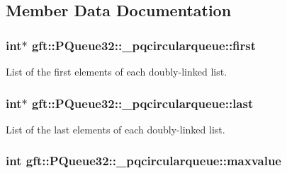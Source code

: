 \subsection{Member Data Documentation}
\subsubsection[{\texorpdfstring{first}{first}}]{\setlength{\rightskip}{0pt plus 5cm}int$\ast$ gft\+::\+P\+Queue32\+::\+\_\+pqcircularqueue\+::first}\hypertarget{structgft_1_1PQueue32_1_1__pqcircularqueue_abdbbf105caf80766f51fbc271d794ccb}{}\label{structgft_1_1PQueue32_1_1__pqcircularqueue_abdbbf105caf80766f51fbc271d794ccb}


List of the first elements of each doubly-\/linked list. 

\subsubsection[{\texorpdfstring{last}{last}}]{\setlength{\rightskip}{0pt plus 5cm}int$\ast$ gft\+::\+P\+Queue32\+::\+\_\+pqcircularqueue\+::last}\hypertarget{structgft_1_1PQueue32_1_1__pqcircularqueue_a9d495d213b910328120e4ed127dcbaec}{}\label{structgft_1_1PQueue32_1_1__pqcircularqueue_a9d495d213b910328120e4ed127dcbaec}


List of the last elements of each doubly-\/linked list. 

\subsubsection[{\texorpdfstring{maxvalue}{maxvalue}}]{\setlength{\rightskip}{0pt plus 5cm}int gft\+::\+P\+Queue32\+::\+\_\+pqcircularqueue\+::maxvalue}\hypertarget{structgft_1_1PQueue32_1_1__pqcircularqueue_a48f348ed1f639dd4970aa5f35feb81e0}{}\label{structgft_1_1PQueue32_1_1__pqcircularqueue_a48f348ed1f639dd4970aa5f35feb81e0}


